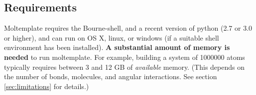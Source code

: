 \documentclass[11pt]{article}
\begin{document}



\subsection*{Requirements}

Moltemplate requires the Bourne-shell, and a recent version of python (2.7 or 3.0 or higher), and can run on OS X, linux, or windows (if a suitable shell environment has been installed).  
\textbf{A substantial amount of memory is needed} to run moltemplate.
For example, building a system of 1000000 atoms typically requires 
between 3 and 12 GB of \textit{available} memory.
(This depends on the number of bonds, molecules, and angular interactions.
 See section \ref{sec:limitations} for details.)

\end{document}
